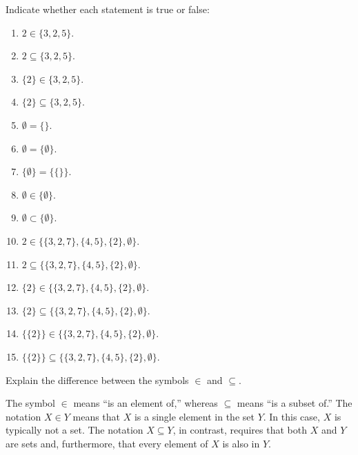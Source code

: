 \documentclass[nooutcomes]{ximera}
\begin{document}
\begin{problem}
Indicate whether each statement is true or false: 
\begin{enumerate}
\item $2\in \{3, 2, 5\}$. 
\item $2\subseteq \{3, 2, 5\}$. 
\item $\{2\}\in \{3, 2, 5\}$.  
\item $\{2\}\subseteq \{3, 2, 5\}$.  
\item $\emptyset = \{ \}$. 
\item $\emptyset = \{ \emptyset \} $. 
\item $\{ \emptyset \} = \{\{\}\}$. 
\item $\emptyset \in \{ \emptyset \} $. 
\item $\emptyset \subset \{ \emptyset \} $. 
\item $2 \in \{ \{3,2,7\}, \{4,5\}, \{2\}, \emptyset \}$. 
\item $2 \subseteq \{ \{3,2,7\}, \{4,5\}, \{2\}, \emptyset \}$. 
\item $\{2\} \in \{ \{3,2,7\}, \{4,5\}, \{2\}, \emptyset \}$. 
\item $\{2\} \subseteq \{ \{3,2,7\}, \{4,5\}, \{2\}, \emptyset \}$. 
\item $\{\{2\}\} \in \{ \{3,2,7\}, \{4,5\}, \{2\}, \emptyset \}$. 
\item $\{\{2\}\} \subseteq \{ \{3,2,7\}, \{4,5\}, \{2\}, \emptyset \}$. 
\end{enumerate}

\end{problem}

\begin{problem}
Explain the difference between the symbols $\in$ and $\subseteq$.
\begin{freeResponse}
\begin{hint}
The symbol $\in$ means ``is an element of,'' whereas $\subseteq$ means ``is a subset of.'' 
The notation $X \in Y$ means that $X$ is a single element in the set $Y$.  In this case, $X$ is typically not a set.  The notation $X \subseteq Y$, in contrast, requires that both $X$ and $Y$ are sets and, furthermore, that every element of $X$ is also in $Y$.
\end{hint}
\end{freeResponse}
\end{problem}
\end{document}
